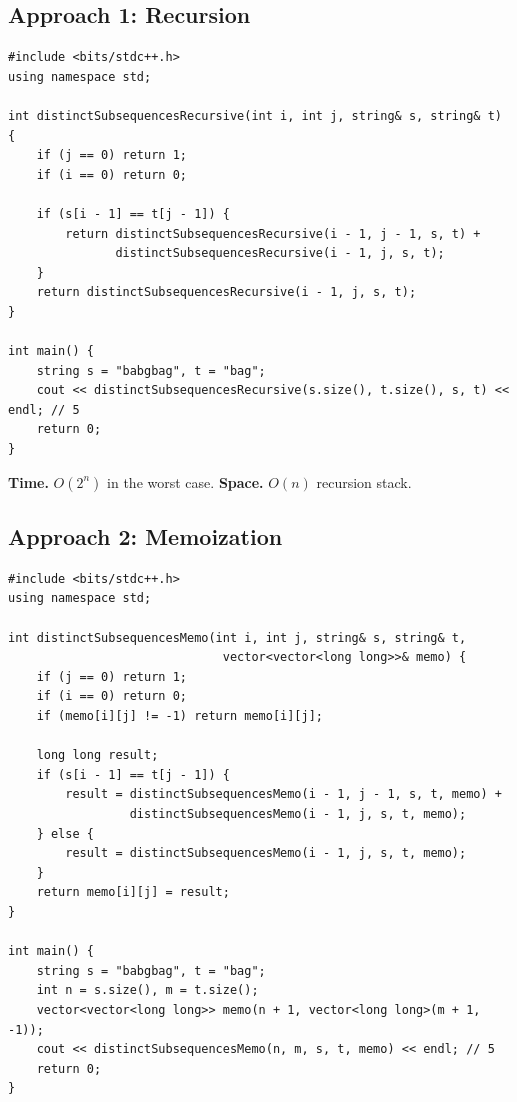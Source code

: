 \subsection*{Approach 1: Recursion}

\begin{lstlisting}
#include <bits/stdc++.h>
using namespace std;

int distinctSubsequencesRecursive(int i, int j, string& s, string& t) {
    if (j == 0) return 1;
    if (i == 0) return 0;

    if (s[i - 1] == t[j - 1]) {
        return distinctSubsequencesRecursive(i - 1, j - 1, s, t) +
               distinctSubsequencesRecursive(i - 1, j, s, t);
    }
    return distinctSubsequencesRecursive(i - 1, j, s, t);
}

int main() {
    string s = "babgbag", t = "bag";
    cout << distinctSubsequencesRecursive(s.size(), t.size(), s, t) << endl; // 5
    return 0;
}
\end{lstlisting}

\begin{complexitybox}
\textbf{Time.} $O(2^n)$ in the worst case.
\textbf{Space.} $O(n)$ recursion stack.
\end{complexitybox}

\subsection*{Approach 2: Memoization}

\begin{lstlisting}
#include <bits/stdc++.h>
using namespace std;

int distinctSubsequencesMemo(int i, int j, string& s, string& t,
                              vector<vector<long long>>& memo) {
    if (j == 0) return 1;
    if (i == 0) return 0;
    if (memo[i][j] != -1) return memo[i][j];

    long long result;
    if (s[i - 1] == t[j - 1]) {
        result = distinctSubsequencesMemo(i - 1, j - 1, s, t, memo) +
                 distinctSubsequencesMemo(i - 1, j, s, t, memo);
    } else {
        result = distinctSubsequencesMemo(i - 1, j, s, t, memo);
    }
    return memo[i][j] = result;
}

int main() {
    string s = "babgbag", t = "bag";
    int n = s.size(), m = t.size();
    vector<vector<long long>> memo(n + 1, vector<long long>(m + 1, -1));
    cout << distinctSubsequencesMemo(n, m, s, t, memo) << endl; // 5
    return 0;
}
\end{lstlisting}

